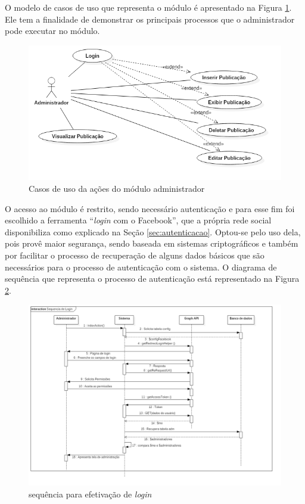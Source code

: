 O modelo de casos de uso que representa o módulo é apresentado na Figura \ref{fig:casosDeUsoADM}. Ele tem a finalidade de demonstrar os principais processos que o administrador pode executar no módulo.

\begin{figure}
\centering
\includegraphics[width=\textwidth]{figuras/casosDeUsoADM}
\caption{Casos de uso da ações do módulo administrador}
\label{fig:casosDeUsoADM}
\end{figure}

O acesso ao módulo é restrito, sendo necessário autenticação e para esse fim foi escolhido a ferramenta ``\textit{login} com o Facebook'', que a própria rede social disponibiliza como explicado na Seção \ref{sec:autenticacao}. Optou-se pelo uso dela, pois provê maior segurança, sendo baseada em sistemas criptográficos e também por facilitar o processo de recuperação de alguns dados básicos que são necessários para o processo de autenticação com o sistema. O diagrama de sequência que representa o processo de autenticação está representado na Figura \ref{fig:sequencialogin}.

\begin{figure}
\centering
\includegraphics[width=\textwidth]{figuras/sequencialogin}
\caption{sequência para efetivação de \textit{login}}
\label{fig:sequencialogin}
\end{figure}

